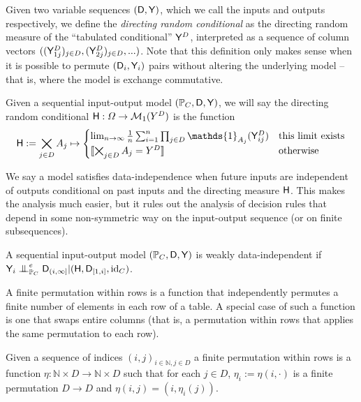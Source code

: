Given two variable sequences $(\mathsf{D},\mathsf{Y})$, which we call the inputs and outputs respectively, we define the \emph{directing random conditional} as the directing random measure of the ``tabulated conditional'' $\mathsf{Y}^D$, interpreted as a sequence of column vectors $((\mathsf{Y}^D_{1j})_{j\in D},(\mathsf{Y}^D_{2j})_{j\in D},...)$. Note that this definition only makes sense when it is possible to permute $(\mathsf{D}_i,\mathsf{Y}_i)$ pairs without altering the underlying model -- that is, where the model is exchange commutative.

\begin{definition}\label{def:dir_rand_cond}
Given a sequential input-output model $(\mathbb{P}_C,\mathsf{D},\mathsf{Y})$, we will say the directing random conditional $\mathsf{H}:\Omega\to \mathcal{M}_1(Y^D)$ is the function
\begin{align}
    \RV{H} := \bigtimes_{j\in D} A_j \mapsto \begin{cases}
    \lim_{n\to \infty}\frac{1}{n} \sum_{i=1}^{n} \prod_{j\in D} \mathds{1}_{A_j}(\RV{Y}^D_{ij}) & \text{this limit exists}\\
    \llbracket \bigtimes_{j\in D} A_j = Y^D \rrbracket &\text{otherwise}
    \end{cases} 
\end{align}
\end{definition}

We say a model satisfies data-independence when future inputs are independent of outputs conditional on past inputs and the directing measure $\mathsf{H}$. This makes the analysis much easier, but it rules out the analysis of decision rules that depend in some non-symmetric way on the input-output sequence (or on finite subsequences).

\begin{definition}\label{def:weak_di}
A sequential input-output model $(\mathbb{P}_C,\mathsf{D},\mathsf{Y})$ is weakly data-independent if $\RV{Y}_i\CI^e_{\prob{P}_C} \RV{D}_{(i,\infty]}|(\RV{H},\RV{D}_{[1,i]},\text{id}_C)$.
\end{definition}

A finite permutation within rows is a function that independently permutes a finite number of elements in each row of a table. A special case of such a function is one that swaps entire columns (that is, a permutation within rows that applies the same permutation to each row).

\begin{definition}
Given a sequence of indices $(i,j)_{i\in \mathbb{N},j\in D}$ a finite permutation within rows is a function $\eta:\mathbb{N}\times D\to \mathbb{N}\times D$ such that for each $j\in D$, $\eta_i:=\eta(i,\cdot)$ is a finite permutation $D\to D$ and $\eta(i,j)=(i,\eta_i(j))$.
\end{definition}

